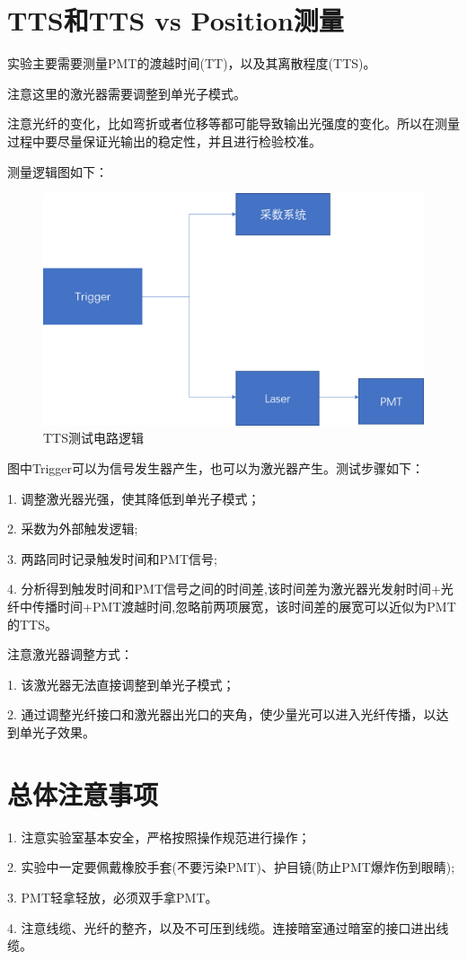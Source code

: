 \documentclass[UTF8,a4paper,12pt]{ctexart}
\begin{document}
\section{TTS和TTS vs Position测量}
实验主要需要测量PMT的渡越时间(TT)，以及其离散程度(TTS)。\par
注意这里的激光器需要调整到单光子模式。\par
注意光纤的变化，比如弯折或者位移等都可能导致输出光强度的变化。所以在测量过程中要尽量保证光输出的稳定性，并且进行检验校准。\par
测量逻辑图如下：\par
\begin{figure}[H]
	\centering
	\includegraphics[width=0.8\linewidth]{TTS测量逻辑}
	\caption[图6]{TTS测试电路逻辑}
\end{figure}
图中Trigger可以为信号发生器产生，也可以为激光器产生。测试步骤如下：\par
1. 调整激光器光强，使其降低到单光子模式；\par
2. 采数为外部触发逻辑;\par
3. 两路同时记录触发时间和PMT信号;\par
4. 分析得到触发时间和PMT信号之间的时间差,该时间差为激光器光发射时间+光纤中传播时间+PMT渡越时间,忽略前两项展宽，该时间差的展宽可以近似为PMT的TTS。\par
注意激光器调整方式：\par
1. 该激光器无法直接调整到单光子模式；\par
2. 通过调整光纤接口和激光器出光口的夹角，使少量光可以进入光纤传播，以达到单光子效果。\par

\section{总体注意事项}
1. 注意实验室基本安全，严格按照操作规范进行操作；\par
2. 实验中一定要佩戴橡胶手套(不要污染PMT)、护目镜(防止PMT爆炸伤到眼睛);\par
3. PMT轻拿轻放，必须双手拿PMT。\par
4. 注意线缆、光纤的整齐，以及不可压到线缆。连接暗室通过暗室的接口进出线缆。\par

 
\end{document}
